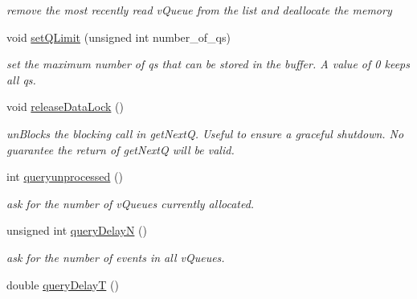 \begin{DoxyCompactItemize}
\begin{DoxyCompactList}\small\item\em remove the most recently read v\+Queue from the list and deallocate the memory \end{DoxyCompactList}\item 
void \hyperlink{classev_1_1queueAllocator_af6ca03ee35af1cf7dd5e2d8d8141e704}{set\+Q\+Limit} (unsigned int number\+\_\+of\+\_\+qs)\hypertarget{classev_1_1queueAllocator_af6ca03ee35af1cf7dd5e2d8d8141e704}{}\label{classev_1_1queueAllocator_af6ca03ee35af1cf7dd5e2d8d8141e704}

\begin{DoxyCompactList}\small\item\em set the maximum number of qs that can be stored in the buffer. A value of 0 keeps all qs. \end{DoxyCompactList}\item 
void \hyperlink{classev_1_1queueAllocator_aa3ab79f1da7f2930811ab980347b0305}{release\+Data\+Lock} ()\hypertarget{classev_1_1queueAllocator_aa3ab79f1da7f2930811ab980347b0305}{}\label{classev_1_1queueAllocator_aa3ab79f1da7f2930811ab980347b0305}

\begin{DoxyCompactList}\small\item\em un\+Blocks the blocking call in get\+NextQ. Useful to ensure a graceful shutdown. No guarantee the return of get\+NextQ will be valid. \end{DoxyCompactList}\item 
int \hyperlink{classev_1_1queueAllocator_adb785d0d33ba16522f8846da35c7ebab}{queryunprocessed} ()\hypertarget{classev_1_1queueAllocator_adb785d0d33ba16522f8846da35c7ebab}{}\label{classev_1_1queueAllocator_adb785d0d33ba16522f8846da35c7ebab}

\begin{DoxyCompactList}\small\item\em ask for the number of v\+Queues currently allocated. \end{DoxyCompactList}\item 
unsigned int \hyperlink{classev_1_1queueAllocator_a557861a4f3730b4d8da7895173c6986a}{query\+DelayN} ()\hypertarget{classev_1_1queueAllocator_a557861a4f3730b4d8da7895173c6986a}{}\label{classev_1_1queueAllocator_a557861a4f3730b4d8da7895173c6986a}

\begin{DoxyCompactList}\small\item\em ask for the number of events in all v\+Queues. \end{DoxyCompactList}\item 
double \hyperlink{classev_1_1queueAllocator_a439a2729d5474986977e26e63a9edf03}{query\+DelayT} ()\hypertarget{classev_1_1queueAllocator_a439a2729d5474986977e26e63a9edf03}{}\label{classev_1_1queueAllocator_a439a2729d5474986977e26e63a9edf03}


\end{DoxyCompactItemize}
